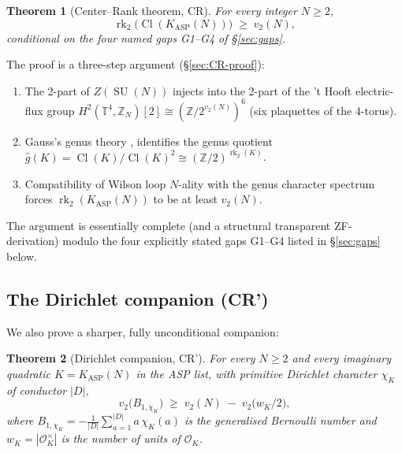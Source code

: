 \documentclass[11pt,a4paper,reqno]{amsart}
\newtheorem{theorem}{Theorem}[section]
\theoremstyle{definition}
\DeclareMathOperator{\SU}{SU}
\DeclareMathOperator{\Cl}{Cl}
\DeclareMathOperator{\rk}{rk}
\newcommand{\OK}{\mathcal{O}_K}
\newcommand{\KASP}{K_{\mathrm{ASP}}}
\newcommand{\ZZ}{\mathbb{Z}}
\newcommand{\TT}{\mathbb{T}}
\newcommand{\vtwo}{v_2}
\begin{document}
\begin{theorem}[Center--Rank theorem, CR]\label{thm:CR}
For every integer $N\ge 2$,
\begin{equation}\label{eq:CR}
  \rk_2\bigl(\Cl(\KASP(N))\bigr) \;\ge\; \vtwo(N),
\end{equation}
conditional on the four named gaps G1--G4 of \S\ref{sec:gaps}.
\end{theorem}

The proof is a three-step argument (\S\ref{sec:CR-proof}):
\begin{enumerate}[label=\textbf{S\arabic*.}, leftmargin=2em]
  \item The 2-part of $Z(\SU(N))$ injects into the 2-part of the 't Hooft
        electric-flux group $H^2(\TT^4, \ZZ_N)[2] \cong (\ZZ/2^{\vtwo(N)})^6$
        (six plaquettes of the 4-torus).
  \item Gauss's genus theory \cite[\S\S 246--262]{Gauss1801},
        \cite[Thm.~7.7]{Cox1989} identifies the genus quotient
        $\widehat{g}(K) = \Cl(K)/\Cl(K)^2 \cong (\ZZ/2)^{\rk_2(K)}$.
  \item Compatibility of Wilson loop $N$-ality with the genus character
        spectrum forces $\rk_2(\KASP(N))$ to be at least $\vtwo(N)$.
\end{enumerate}
The argument is essentially complete (and a structural transparent
ZF-derivation) modulo the four explicitly stated gaps G1--G4 listed in
\S\ref{sec:gaps} below.

\subsection{The Dirichlet companion (CR')}\label{ss:CRprimeintro}

We also prove a sharper, fully unconditional companion:

\begin{theorem}[Dirichlet companion, CR']\label{thm:CRprime}
For every $N\ge 2$ and every imaginary quadratic $K = \KASP(N)$ in the ASP
list, with primitive Dirichlet character $\chi_K$ of conductor $|D|$,
\begin{equation}\label{eq:CRprime}
  \vtwo\!\bigl(B_{1,\chi_K}\bigr) \;\ge\; \vtwo(N) \;-\; \vtwo\!\bigl(w_K/2\bigr),
\end{equation}
where $B_{1,\chi_K} = -\frac{1}{|D|}\sum_{a=1}^{|D|} a\,\chi_K(a)$ is the
generalised Bernoulli number and $w_K = |\OK^\times|$ is the number of units of
$\OK$.
\end{theorem}
\end{document}
